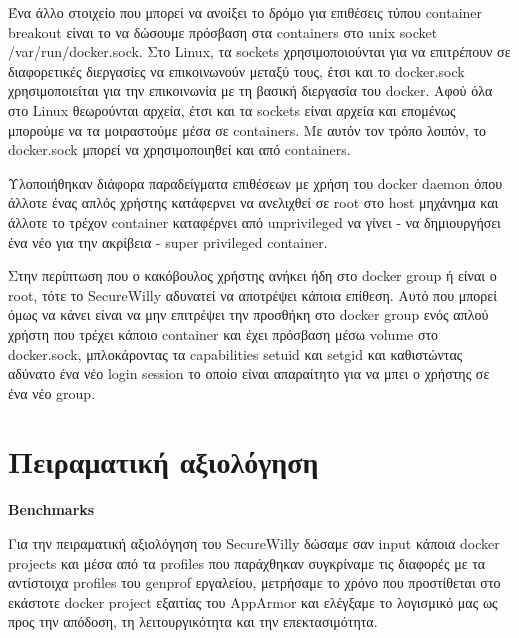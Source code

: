 \begin{description}[style=nextline]
Ένα άλλο στοιχείο που μπορεί να ανοίξει το δρόμο για επιθέσεις τύπου \en container breakout\gr{} είναι το να δώσουμε πρόσβαση στα \en containers\gr{} στο \en unix socket /var/run/docker.sock\gr{}. Στο \en Linux\gr{}, τα \en sockets\gr{} χρησιμοποιούνται για να επιτρέπουν σε διαφορετικές διεργασίες να επικοινωνούν μεταξύ τους, έτσι και το \en docker.sock\gr{} χρησιμοποιείται για την επικοινωνία με τη βασική διεργασία του \en docker\gr{}. Αφού όλα στο \en Linux\gr{} θεωρούνται αρχεία, έτσι και τα \en sockets\gr{} είναι αρχεία και επομένως μπορούμε να τα μοιραστούμε μέσα σε \en containers\gr{}. Με αυτόν τον τρόπο λοιπόν, το \en docker.sock\gr{} μπορεί να χρησιμοποιηθεί και από \en containers\gr{}.

Υλοποιήθηκαν διάφορα παραδείγματα επιθέσεων με χρήση του \en docker daemon\gr{} όπου άλλοτε ένας απλός χρήστης κατάφερνει να ανελιχθεί σε \en root\gr{} στο \en host\gr{} μηχάνημα και άλλοτε το τρέχον \en container\gr{} καταφέρνει από \en unprivileged\gr{} να γίνει - να δημιουργήσει ένα νέο για την ακρίβεια - \en super privileged container\gr{}.

Στην περίπτωση που ο κακόβουλος χρήστης ανήκει ήδη στο \en docker group\gr{} ή είναι ο \en root\gr{}, τότε το \en SecureWilly\gr{} αδυνατεί να αποτρέψει κάποια επίθεση. Αυτό που μπορεί όμως να κάνει είναι να μην επιτρέψει την προσθήκη στο \en docker group\gr{} ενός απλού χρήστη που τρέχει κάποιο \en container\gr{} και έχει πρόσβαση μέσω \en volume\gr{} στο \en docker.sock\gr{}, μπλοκάροντας τα \en capabilities setuid\gr{} και \en setgid\gr{} και καθιστώντας αδύνατο ένα νέο \en login session\gr{} το οποίο είναι απαραίτητο για να μπει ο χρήστης σε ένα νέο \en group\gr{}.
\end{description}

\section*{Πειραματική αξιολόγηση}
\hfill\break
\textbf{\en Benchmarks\gr{}}
\hfill\break

Για την πειραματική αξιολόγηση του \en SecureWilly\gr{} δώσαμε σαν \en input\gr{} κάποια \en docker projects\gr{} και μέσα από τα \en profiles\gr{} που παράχθηκαν συγκρίναμε τις διαφορές με τα αντίστοιχα \en profiles\gr{} του \en genprof\gr{} εργαλείου, μετρήσαμε το χρόνο που προστίθεται στο εκάστοτε \en docker project\gr{} εξαιτίας του \en AppArmor\gr{} και ελέγξαμε το λογισμικό μας ως προς την απόδοση, τη λειτουργικότητα και την επεκτασιμότητα.

